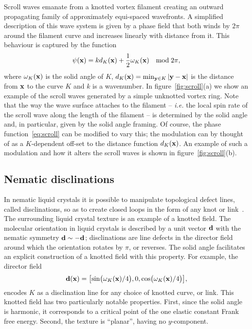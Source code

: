     Scroll waves emanate from a knotted vortex filament creating an outward propagating family of approximately equi-spaced wavefronts. A simplified description of this wave system is given by a phase field that both winds by $2\pi$ around the filament curve and increases linearly with distance from it. This behaviour is captured by the function 
    \begin{equation}
        \psi({\bf x}) = k d_{K}({\bf x}) + \frac{1}{2} \omega_{K}({\bf x}) \quad \textrm{mod}\; 2\pi ,
        \label{eq:scroll}
    \end{equation} 
    where $\omega_K({\bf x})$ is the solid angle of $K$, $d_{K}({\bf x}) = \min_{{\bf y} \in K} |{\bf y}-{\bf x}|$ is the distance from ${\bf x}$ to the curve $K$ and $k$ is a wavenumber. In figure~\ref{fig:scroll}(a) we show an example of the scroll waves generated by a simple unknotted vortex ring. 
    Note that the way the wave surface attaches to the filament -- {\sl i.e.} the local spin rate of the scroll wave along the length of the filament -- is determined by the solid angle and, in particular, given by the solid angle framing. Of course, the phase function~\eqref{eq:scroll} can be modified to vary this; the modulation can by thought of as a $K$-dependent off-set to the distance function $d_{K}({\bf x})$. An example of such a modulation and how it alters the scroll waves is shown in figure~\ref{fig:scroll}(b). 

    \subsection{Nematic disclinations}
    \label{subsec:nematics}

    In nematic liquid crystals it is possible to manipulate topological defect lines, called disclinations, so as to create closed loops in the form of any knot or link~\citep{Tkalec2011,Copar2015,Machon2013}. The surrounding liquid crystal texture is an example of a knotted field. 
    The molecular orientation in liquid crystals is described by a unit vector ${\bf d}$ with the nematic symmetry ${\bf d} \sim - {\bf d}$; disclinations are line defects in the director field around which the orientation rotates by $\pi$, or reverses. 
    The solid angle facilitates an explicit construction of a knotted field with this property. For example, the director field 
    \begin{equation}
        {\bf d}({\bf x}) = \bigl[ \sin\bigl( \omega_{K}({\bf x}) / 4 \bigr) , 0 , \cos\bigl( \omega_{K}({\bf x}) / 4 \bigr) \bigr], 
        \label{eq:planar_nematic}
    \end{equation}
    encodes $K$ as a disclination line for any choice of knotted curve, or link. This knotted field has two particularly notable properties. First, since the solid angle is harmonic, it corresponds to a critical point of the one elastic constant Frank free energy. Second, the texture is ``planar'', having no $y$-component. 

